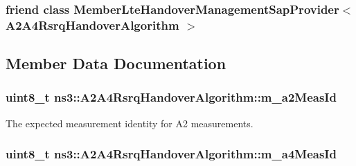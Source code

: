 \subsubsection[{\texorpdfstring{Member\+Lte\+Handover\+Management\+Sap\+Provider$<$ A2\+A4\+Rsrq\+Handover\+Algorithm $>$}{MemberLteHandoverManagementSapProvider< A2A4RsrqHandoverAlgorithm >}}]{\setlength{\rightskip}{0pt plus 5cm}friend class {\bf Member\+Lte\+Handover\+Management\+Sap\+Provider}$<$ {\bf A2\+A4\+Rsrq\+Handover\+Algorithm} $>$\hspace{0.3cm}{\ttfamily [friend]}}\hypertarget{classns3_1_1A2A4RsrqHandoverAlgorithm_a19b73e89b335cae4f61749f6146e7a8f}{}\label{classns3_1_1A2A4RsrqHandoverAlgorithm_a19b73e89b335cae4f61749f6146e7a8f}


\subsection{Member Data Documentation}
\subsubsection[{\texorpdfstring{m\+\_\+a2\+Meas\+Id}{m_a2MeasId}}]{\setlength{\rightskip}{0pt plus 5cm}uint8\+\_\+t ns3\+::\+A2\+A4\+Rsrq\+Handover\+Algorithm\+::m\+\_\+a2\+Meas\+Id\hspace{0.3cm}{\ttfamily [private]}}\hypertarget{classns3_1_1A2A4RsrqHandoverAlgorithm_ac52e42e6ee41a0faffdcbc75ff7e2e02}{}\label{classns3_1_1A2A4RsrqHandoverAlgorithm_ac52e42e6ee41a0faffdcbc75ff7e2e02}


The expected measurement identity for A2 measurements. 

\subsubsection[{\texorpdfstring{m\+\_\+a4\+Meas\+Id}{m_a4MeasId}}]{\setlength{\rightskip}{0pt plus 5cm}uint8\+\_\+t ns3\+::\+A2\+A4\+Rsrq\+Handover\+Algorithm\+::m\+\_\+a4\+Meas\+Id\hspace{0.3cm}{\ttfamily [private]}}\hypertarget{classns3_1_1A2A4RsrqHandoverAlgorithm_acad13d470305131b7cfa66f5feb0f0bf}{}\label{classns3_1_1A2A4RsrqHandoverAlgorithm_acad13d470305131b7cfa66f5feb0f0bf}


